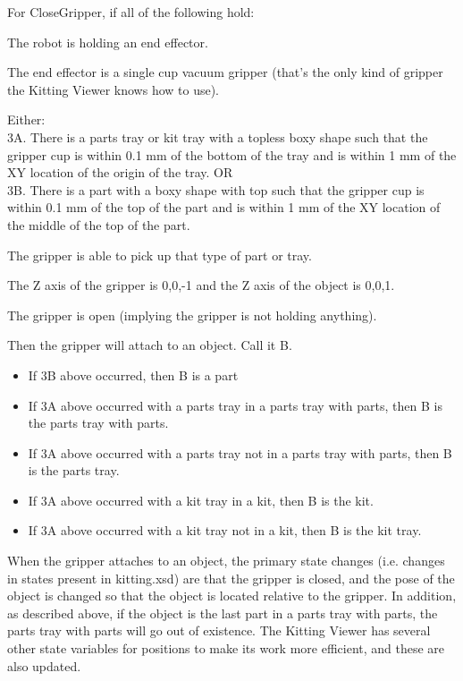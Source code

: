 For CloseGripper, if all of the following hold:
\begin{list}{.}%
{}

\item  The robot is holding an end effector.

\item  The end effector is a single cup vacuum gripper (that's the only
   kind of gripper the Kitting Viewer knows how to use).

\item Either:\\
3A. There is a parts tray or kit tray with a topless boxy shape
    such that the gripper cup is within 0.1 mm of the bottom of the
    tray and is within 1 mm of the XY location of the origin of the tray. OR\\
3B. There is a part with a boxy shape with top such that the gripper cup
    is within 0.1 mm of the top of the part and is within 1 mm of the XY
    location of the middle of the top of the part.

\item The gripper is able to pick up that type of part or tray.

\item The Z axis of the gripper is 0,0,-1 and the Z axis of the object is
    0,0,1.

\item The gripper is open (implying the gripper is not holding anything).

\end{list}

Then the gripper will attach to an object. Call it B.

\begin{itemize}

\item If 3B above occurred, then B is a part

\item If 3A above occurred with a parts tray in a parts tray with parts,
   then B is the parts tray with parts.

\item If 3A above occurred with a parts tray not in a parts tray with parts,
   then B is the parts tray.

\item If 3A above occurred with a kit tray in a kit, then B is the kit.

\item If 3A above occurred with a kit tray not in a kit, then B is the kit tray.

\end{itemize}

When the gripper attaches to an object, the primary state changes (i.e.
changes in states present in kitting.xsd) are that the gripper is closed,
and the pose of the object is changed so that the object is located
relative to the gripper. In addition, as described above, if the object is
the last part in a parts tray with parts, the parts tray with parts will go
out of existence. The Kitting Viewer has several other state variables for
positions to make its work more efficient, and these are also updated.

